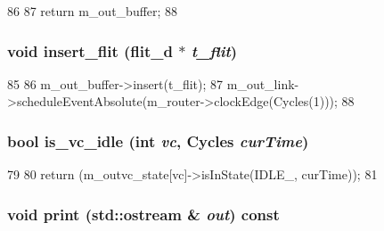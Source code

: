 \begin{DoxyCode}
86 {
87     return m_out_buffer;
88 }
\end{DoxyCode}
\hypertarget{classOutputUnit__d_ae4097c9e6741b690e6388043e7bc7b64}{
\subsubsection[{insert\_\-flit}]{\setlength{\rightskip}{0pt plus 5cm}void insert\_\-flit ({\bf flit\_\-d} $\ast$ {\em t\_\-flit})}}
\label{classOutputUnit__d_ae4097c9e6741b690e6388043e7bc7b64}



\begin{DoxyCode}
85     {
86         m_out_buffer->insert(t_flit);
87         m_out_link->scheduleEventAbsolute(m_router->clockEdge(Cycles(1)));
88     }
\end{DoxyCode}
\hypertarget{classOutputUnit__d_a1f286a568138e723fdd077a18b268c5e}{
\subsubsection[{is\_\-vc\_\-idle}]{\setlength{\rightskip}{0pt plus 5cm}bool is\_\-vc\_\-idle (int {\em vc}, \/  {\bf Cycles} {\em curTime})}}
\label{classOutputUnit__d_a1f286a568138e723fdd077a18b268c5e}



\begin{DoxyCode}
79     {
80         return (m_outvc_state[vc]->isInState(IDLE_, curTime));
81     }
\end{DoxyCode}
\hypertarget{classOutputUnit__d_ac55fe386a101fbae38c716067c9966a0}{
\subsubsection[{print}]{\setlength{\rightskip}{0pt plus 5cm}void print (std::ostream \& {\em out}) const}}
\label{classOutputUnit__d_ac55fe386a101fbae38c716067c9966a0}


